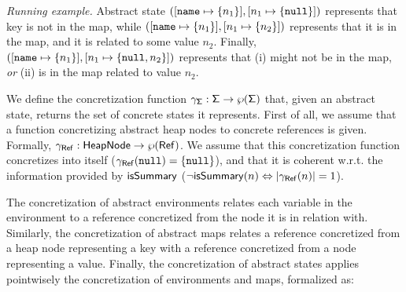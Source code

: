 
\newcommand\runex{\noindent \emph{Running example. }}
\runex
Abstract state $([\mathtt{name} \mapsto \{n_1\}], [n_1 \mapsto \{\mathtt{null}\}])$ represents that key  is not in the map, while $([\mathtt{name} \mapsto \{n_1\}], [n_1 \mapsto \{n_2\}])$ represents that it is in the map, and it is related to some value $n_2$. Finally, $([\mathtt{name} \mapsto \{n_1\}], [n_1 \mapsto \{\mathtt{null}, n_2\}])$ represents that  (i) might not be in the map, \emph{or} (ii) is in the map related to value $n_2$.

%
We define the concretization function $\gamma_{\mathsf{\Sigma}} : \mathsf{\Sigma} \to \wp(\mathsf{\Sigma})$ that, given an abstract state, returns the set of concrete states it represents. First of all, we assume that a function concretizing abstract heap nodes to concrete references is given. Formally, $\gamma_{\mathsf{Ref}} : \mathsf{HeapNode} \to \wp(\mathsf{Ref})$. We assume that this concretization function concretizes  into itself ($\gamma_{\mathsf{Ref}}(\mathtt{null})=\{\mathtt{null}\}$), and that it is coherent w.r.t. the information provided by $\mathsf{isSummary}$ ($\neg \mathsf{isSummary}(n) \Leftrightarrow |\gamma_{\mathsf{Ref}}(n)|=1$).

The concretization of abstract environments relates each variable in the environment to a reference concretized from the node it is in relation with. Similarly, the concretization of abstract maps relates a reference concretized from a heap node representing a key with a reference concretized from a node representing a value. Finally, the concretization of abstract states applies pointwisely the concretization of environments and maps, formalized as:

